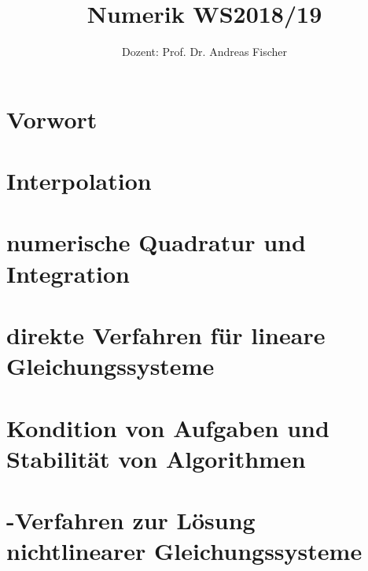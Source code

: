 \documentclass[ngerman,a4paper,order=firstname,sectionreset]{../../texmf/tex/latex/mathscript/mathscript}
\title{\textbf{Numerik WS2018/19}}
\author{Dozent: Prof. Dr. Andreas Fischer}
\begin{document}
\pagestyle{plain}

\maketitle

\hypertarget{tocpage}{}
\tableofcontents
{}

\pagebreak
{}
\pagestyle{fancy}

\chapter*{Vorwort}


\chapter{Interpolation}




\chapter{numerische Quadratur und Integration}






\chapter{direkte Verfahren für lineare Gleichungssysteme}





\chapter{Kondition von Aufgaben und Stabilität von Algorithmen}



\chapter{-Verfahren zur Lösung nichtlinearer Gleichungssysteme}


\end{document}
